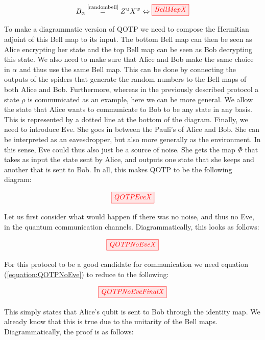 \documentclass[]{article}
\newcommand{\equaltext}[1]{\ensuremath{\stackrel{\text{#1}}{=}}}
\begin{document}
\begin{equation}
	\label{equation:BellMap}
	B_\alpha \equaltext{\ref{randombell}} Z^uX^w \Leftrightarrow \tikzfig{BellMapX}
\end{equation}

To make a diagrammatic version of QOTP we need to compose the Hermitian adjoint of this Bell map to its input. The bottom Bell map can then be seen as Alice encrypting her state and the top Bell map can be seen as Bob decrypting this state. We also need to make sure that Alice and Bob make the same choice in $\alpha$ and thus use the same Bell map. This can be done by connecting the outputs of the spiders that generate the random numbers to the Bell maps of both Alice and Bob. Furthermore, whereas in the previously described protocol a state $\rho$ is communicated as an example, here we can be more general. We allow the state that Alice wants to communicate to Bob to be any state in any basis. This is represented by a dotted line at the bottom of the diagram. Finally, we need to introduce Eve. She goes in between the Pauli's of Alice and Bob. She can be interpreted as an eavesdropper, but also more generally as the environment. In this sense, Eve could thus also just be a source of noise. She gets the map $\Phi$ that takes as input the state sent by Alice, and outputs one state that she keeps and another that is sent to Bob. In all, this makes QOTP to be the following diagram:

\begin{equation}
\tikzfig{QOTPEveX}
\label{equation:QOTPEve}
\end{equation}

Let us first consider what would happen if there was no noise, and thus no Eve, in the quantum communication channels. Diagrammatically, this looks as follows:

\begin{equation}
	\tikzfig{QOTPNoEveX}
	\label{equation:QOTPNoEve}
\end{equation}

For this protocol to be a good candidate for communication we need equation (\ref{equation:QOTPNoEve}) to reduce to the following: 

\begin{equation}
	\tikzfig{QOTPNoEveFinalX}
\end{equation}

This simply states that Alice's qubit is sent to Bob through the identity map. We already know that this is true due to the unitarity of the Bell maps. Diagrammatically, the proof is as follows:
\end{document}
